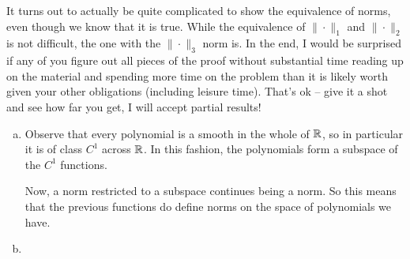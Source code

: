 \documentclass[12pt]{memoir}
\begin{document}
\begin{nonum-Rmk}
    It turns out to actually be quite complicated to
  show the equivalence of norms, even though we know that it is true. While the equivalence of
  $\|\cdot\|_1$ and  $\|\cdot\|_2$ is not difficult, the one with the
  $\|\cdot\|_3$ norm is. In the end, I would be surprised if any of you figure
  out all pieces of the proof without substantial time reading up on
  the material and spending more time on the problem than it is likely
  worth given your other obligations (including leisure time). That's
  ok -- give it a shot and see how far you get, I will accept partial results!
\end{nonum-Rmk}

\begin{ptcbr}
\begin{enumerate}[(a)]
    \item Observe that every polynomial is a smooth in the whole of $\mathbb{R}$, so in particular it is of class $C^1$ across $\mathbb{R}$. In this fashion, the polynomials form a subspace of the $C^1$ functions.\par 
    Now, a norm restricted to a subspace continues being a norm. So this means that the previous functions do define norms on the space of polynomials we have.
    \item 
\end{enumerate}
\end{ptcbr}
\end{document}
